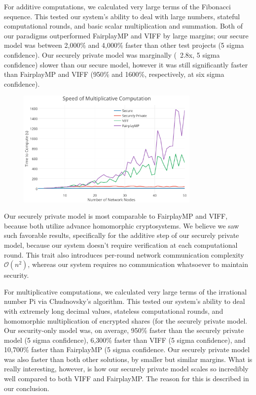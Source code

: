 \documentclass[journal,11pt]{IEEEtran}
\begin{document}
\par For additive computations, we calculated very large terms of the Fibonacci sequence. This tested our system’s ability to deal with large numbers, stateful computational rounds, and basic scalar multiplication and summation. Both of our paradigms outperformed FairplayMP and VIFF by large margins; our secure model was between 2,000\% and 4,000\% faster than other test projects (5 sigma confidence). Our securely private model was marginally (~2.8x, 5 sigma confidence) slower than our secure model, however it was still significantly faster than FairplayMP and VIFF (950\% and 1600\%, respectively, at six sigma confidence).
\begin{figure}
  \centering
  \includegraphics[width=3.5in]{speedMult}
  \caption{}
  \label{speedMult}
\end{figure}
\par Our securely private model is most comparable to FairplayMP and VIFF, because both utilize advance homomorphic cryptosystems. We believe we saw such favorable results, specifically for the additive step of our securely private model, because our system doesn’t require verification at each computational round. This trait also introduces per-round network communication complexity $\mathcal{O}(n^2)$, whereas our system requires no communication whatsoever to maintain security.

\par For multiplicative computations, we calculated very large terms of the irrational number Pi via Chudnovsky’s algorithm. This tested our system’s ability to deal with extremely long decimal values, stateless computational rounds, and homomorphic multiplication of encrypted shares (for the securely private model. Our security-only model was, on average, 950\% faster than the securely private model (5 sigma confidence), 6,300\% faster than VIFF (5 sigma confidence), and 10,700\% faster than FairplayMP (5 sigma confidence. Our securely private model was also faster than both other solutions, by smaller but similar margins. What is really interesting, however, is how our securely private model scales so incredibly well compared to both VIFF and FairplayMP. The reason for this is described in our conclusion.
\end{document}
